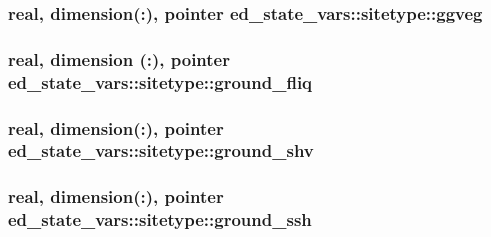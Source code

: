 \subsubsection[{\texorpdfstring{ggveg}{ggveg}}]{\setlength{\rightskip}{0pt plus 5cm}real, dimension(\+:), pointer ed\+\_\+state\+\_\+vars\+::sitetype\+::ggveg}\hypertarget{structed__state__vars_1_1sitetype_abd17bd8d26151daf7a63f71cfe63b294}{}\label{structed__state__vars_1_1sitetype_abd17bd8d26151daf7a63f71cfe63b294}
\subsubsection[{\texorpdfstring{ground\+\_\+fliq}{ground_fliq}}]{\setlength{\rightskip}{0pt plus 5cm}real, dimension (\+:), pointer ed\+\_\+state\+\_\+vars\+::sitetype\+::ground\+\_\+fliq}\hypertarget{structed__state__vars_1_1sitetype_a63a9a6bd6e18958f625999ab54b53cf9}{}\label{structed__state__vars_1_1sitetype_a63a9a6bd6e18958f625999ab54b53cf9}
\subsubsection[{\texorpdfstring{ground\+\_\+shv}{ground_shv}}]{\setlength{\rightskip}{0pt plus 5cm}real, dimension(\+:), pointer ed\+\_\+state\+\_\+vars\+::sitetype\+::ground\+\_\+shv}\hypertarget{structed__state__vars_1_1sitetype_a238358e25cc3c4b3d972d1e1986756b6}{}\label{structed__state__vars_1_1sitetype_a238358e25cc3c4b3d972d1e1986756b6}
\subsubsection[{\texorpdfstring{ground\+\_\+ssh}{ground_ssh}}]{\setlength{\rightskip}{0pt plus 5cm}real, dimension(\+:), pointer ed\+\_\+state\+\_\+vars\+::sitetype\+::ground\+\_\+ssh}\hypertarget{structed__state__vars_1_1sitetype_a055717e328f8af66d1d2f1b2c5751bc3}{}\label{structed__state__vars_1_1sitetype_a055717e328f8af66d1d2f1b2c5751bc3}

